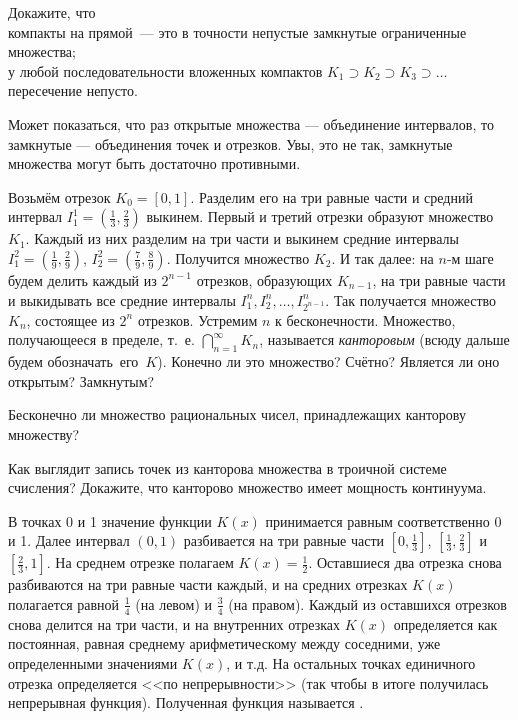 \documentclass[a4paper,12pt]{article}
\begin{document}
Докажите, что
\\
компакты на прямой~--- это в точности непустые замкнутые ограниченные множества;
\\
у любой последовательности вложенных компактов
$K_1\supset K_2\supset K_3\supset\dots$ %
пересечение непусто.




Может показаться, что раз открытые множества — объединение интервалов, то замкнутые — объединения точек и отрезков.
Увы, это не так, замкнутые множества могут быть достаточно противными.

\label{Kantor}
Возьмём отрезок $K_0=[0,1]$. Разделим его на три равные
части и средний интервал $I_1^1=(\frac13, \frac23)$ выкинем.
Первый и третий отрезки образуют множество $K_1$.
Каждый из них разделим на три части
и выкинем средние интервалы $I_1^2=(\frac19, \frac29)$,
$I_2^2=(\frac79, \frac89)$.
Получится множество $K_2$. И так далее: на $n$-м шаге будем
делить каждый из $2^{n-1}$ отрезков, образующих $K_{n-1}$, на три
равные части и выкидывать все средние интервалы
$I_1^n, I_2^n, \dots, I_{2^{n-1}}^n$.
Так получается множество $K_n$, состоящее из $2^n$ отрезков.
Устремим $n$ к бесконечности.
Множество, получающееся в пределе, т.~е. $\bigcap\limits_{n=1}^{\infty} K_n$,
называется \emph{канторовым} (всюду дальше будем обозначать~его~$K$).
Конечно ли это множество? Счётно?
Является ли оно открытым? Замкнутым?



Бесконечно ли множество рациональных чисел, принадлежащих канторову
множеству?


Как выглядит запись точек из канторова множества в троичной системе счисления?
Докажите, что канторово множество имеет мощность континуума.



В точках 0 и 1 значение функции $K(x)$ принимается равным соответственно 0 и 1.
Далее интервал $(0, 1)$ разбивается на три равные части $\left[0,{\frac{1}{3}}\right]$, $\left[{\frac  {1}{3}},{\frac  {2}{3}}\right]$ и $\left[{\frac  {2}{3}},1\right]$.
На среднем отрезке полагаем $K(x)={\frac  {1}{2}}$.
Оставшиеся два отрезка снова разбиваются на три равные части каждый, и на средних отрезках $K(x)$ полагается равной ${\frac {1}{4}}$ (на левом) и ${\frac {3}{4}}$ (на правом).
Каждый из оставшихся отрезков снова делится на три части, и на внутренних отрезках $K(x)$ определяется как постоянная, равная среднему арифметическому между соседними, уже определенными значениями $K(x)$, и т.д.
На остальных точках единичного отрезка определяется <<по непрерывности>> (так чтобы в итоге получилась непрерывная функция).
Полученная функция называется .
\end{document}

